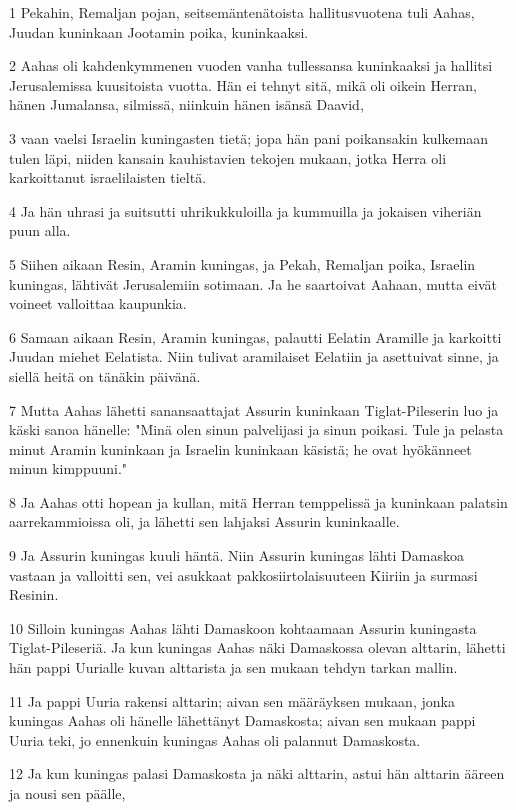 \par 1 Pekahin, Remaljan pojan, seitsemäntenätoista hallitusvuotena tuli Aahas, Juudan kuninkaan Jootamin poika, kuninkaaksi.
\par 2 Aahas oli kahdenkymmenen vuoden vanha tullessansa kuninkaaksi ja hallitsi Jerusalemissa kuusitoista vuotta. Hän ei tehnyt sitä, mikä oli oikein Herran, hänen Jumalansa, silmissä, niinkuin hänen isänsä Daavid,
\par 3 vaan vaelsi Israelin kuningasten tietä; jopa hän pani poikansakin kulkemaan tulen läpi, niiden kansain kauhistavien tekojen mukaan, jotka Herra oli karkoittanut israelilaisten tieltä.
\par 4 Ja hän uhrasi ja suitsutti uhrikukkuloilla ja kummuilla ja jokaisen viheriän puun alla.
\par 5 Siihen aikaan Resin, Aramin kuningas, ja Pekah, Remaljan poika, Israelin kuningas, lähtivät Jerusalemiin sotimaan. Ja he saartoivat Aahaan, mutta eivät voineet valloittaa kaupunkia.
\par 6 Samaan aikaan Resin, Aramin kuningas, palautti Eelatin Aramille ja karkoitti Juudan miehet Eelatista. Niin tulivat aramilaiset Eelatiin ja asettuivat sinne, ja siellä heitä on tänäkin päivänä.
\par 7 Mutta Aahas lähetti sanansaattajat Assurin kuninkaan Tiglat-Pileserin luo ja käski sanoa hänelle: "Minä olen sinun palvelijasi ja sinun poikasi. Tule ja pelasta minut Aramin kuninkaan ja Israelin kuninkaan käsistä; he ovat hyökänneet minun kimppuuni."
\par 8 Ja Aahas otti hopean ja kullan, mitä Herran temppelissä ja kuninkaan palatsin aarrekammioissa oli, ja lähetti sen lahjaksi Assurin kuninkaalle.
\par 9 Ja Assurin kuningas kuuli häntä. Niin Assurin kuningas lähti Damaskoa vastaan ja valloitti sen, vei asukkaat pakkosiirtolaisuuteen Kiiriin ja surmasi Resinin.
\par 10 Silloin kuningas Aahas lähti Damaskoon kohtaamaan Assurin kuningasta Tiglat-Pileseriä. Ja kun kuningas Aahas näki Damaskossa olevan alttarin, lähetti hän pappi Uurialle kuvan alttarista ja sen mukaan tehdyn tarkan mallin.
\par 11 Ja pappi Uuria rakensi alttarin; aivan sen määräyksen mukaan, jonka kuningas Aahas oli hänelle lähettänyt Damaskosta; aivan sen mukaan pappi Uuria teki, jo ennenkuin kuningas Aahas oli palannut Damaskosta.
\par 12 Ja kun kuningas palasi Damaskosta ja näki alttarin, astui hän alttarin ääreen ja nousi sen päälle,

